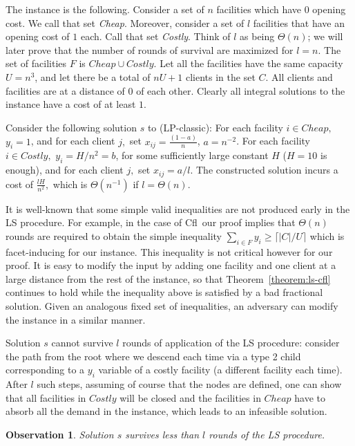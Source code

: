 \documentclass[11pt]{article}\usepackage{amsmath}
\newtheorem{observation}{Observation}[section]
\newcommand{\cfl}{{\sc Cfl}}
\begin{document}
The instance  is the following.  Consider a set  of $n$
facilities  which have $0$  opening cost.  We call  that set
\emph{Cheap}. Moreover, 
consider a  set of $l$ facilities  that have an opening cost  of $1$ each.
Call that set  \emph{Costly}. Think of $l$ as being $\Theta(n)$; we will later
prove that the number of rounds  of survival are maximized for
$l=n$. The set of facilities $F$ is $Cheap\cup
Costly.$  Let all the facilities have the same capacity
$U=n^3$, and let there be a  total of $nU+1$ clients in the set $C.$  All clients and facilities
are at a  distance of $0$ of  each other. Clearly all integral  solutions to the
instance have a cost of at least $1$.

Consider  the following solution  $s$ to  (LP-classic): For  each
facility   $i   \in   Cheap,$   $y_i=1$,    and   for   each   client   $j,$   set
$x_{ij}=\frac{(1-a)}{n}$,  $a=n^{-2}$.  For  each  facility  $i\in  Costly,$  
$y_i=H/n^{2}=b$, for  some sufficiently large 
constant $H$ ($H=10$ is enough), and  for each
client  $j,$  set  $x_{ij}=a/l$.  The  constructed  solution  incurs  a  cost  of
$\frac{l H}{n^{2}},$ which is $\Theta(n^{-1})$ if  $l=\Theta(n).$

It is well-known that some simple valid 
inequalities are not produced early in the LS procedure.
For example, in the case of \cfl\ 
our proof implies that $\Theta(n)$ rounds
are required to obtain the simple inequality $\sum_{i \in F}  y_i \geq \lceil
|{C}| / U  \rceil$ which is facet-inducing for our instance. 
This inequality is not critical however for our proof. 
It is easy to modify the input by adding one  facility and
one client at a large distance from the rest of the instance, 
so that Theorem~\ref{theorem:ls-cfl} continues to hold 
while the inequality   above is  satisfied by a bad fractional solution.
Given an analogous  fixed set of inequalities, an adversary can modify the
instance in a similar manner. 


Solution  $s$ cannot  survive $l$  rounds of  application of  the  LS procedure:
consider the path  from the root where we  descend each time via a  type 2 child
corresponding to  a $y_i$  variable of a  costly facility (a  different facility
each time).  After $l$ such steps, assuming  of course that the  nodes are defined,
one can show  that all facilities in $Costly$ will be  closed and the facilities
in $Cheap$  have to absorb  all the  demand in the  instance, which leads  to an
infeasible solution. 


\begin{observation}
\label{observation:l-rounds}
Solution $s$ survives less than $l$ rounds of the LS procedure.
\end{observation}
\end{document}
